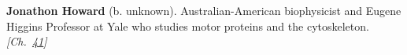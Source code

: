 \textbf{Jonathon Howard} (b. unknown). Australian-American biophysicist and Eugene Higgins Professor at Yale who studies motor proteins and the cytoskeleton. \emph{[Ch.~\hyperref[ch:hough]{41}]}

